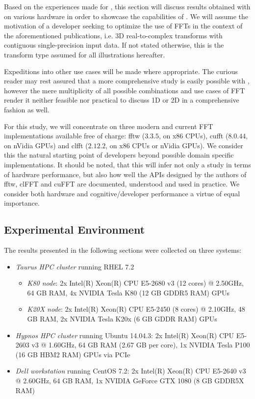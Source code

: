 Based on the experiences made for \cite{preibisch2014efficient, schmid2015real}, this section will discuss results obtained with \gearshifft{} on various hardware in order to showcase the capabilities of \gearshifft{}. We will assume the motivation of a developer seeking to optimize the use of FFTs in the context of the aforementioned publications, i.e. 3D real-to-complex transforms with contiguous single-precision input data. If not stated otherwise, this is the transform type assumed for all illustrations hereafter. 

Expeditions into other use cases will be made where appropriate. The curious reader may rest assured that a more comprehensive study is easily possible with \gearshifft{}, however the mere multiplicity of all possible combinations and use cases of FFT render it neither feasible nor practical to discuss 1D or 2D in a comprehensive fashion as well.

For this study, we will concentrate on three modern and current FFT implementations available free of charge: fftw ($3.3.5$, on x86 CPUs), cufft ($8.0.44$, on nVidia GPUs) and clfft ($2.12.2$, on x86 CPUs or nVidia GPUs). We consider this the natural starting point of developers beyond possible domain specific implementations. It should be noted, that this will infer not only a study in terms of hardware performance, but also how well the APIs designed by the authors of fftw, clFFT and cuFFT are documented, understood and used in practice. We consider both hardware and cognitive/developer performance a virtue of equal importance.

\subsection{Experimental Environment}
\label{ssec:env}

The results presented in the following sections were collected on three systems:

\begin{itemize}
\item \emph{Taurus HPC cluster}\cite{taurus} running RHEL 7.2
  \begin{itemize}
  \item \emph{K80 node}: 2x Intel(R) Xeon(R) CPU E5-2680 v3 (12 cores) @ 2.50GHz, 64 GB RAM, 4x NVIDIA Tesla K80 (12 GB GDDR5 RAM) GPUs 
  \item \emph{K20X node}: 2x Intel(R) Xeon(R) CPU E5-2450 (8 cores) @ 2.10GHz, 48 GB RAM, 2x NVIDIA Tesla K20x (6 GB GDDR RAM) GPUs 
  \end{itemize}
\item \emph{Hypnos HPC cluster}\cite{hypnos} running Ubuntu 14.04.3:\newline
  2x Intel(R) Xeon(R) CPU E5-2603 v3 @ 1.60GHz, 64 GB RAM (2.67 GB per core), 1x NVIDIA Tesla P100 (16 GB HBM2 RAM) GPUs via PCIe 
\item  \emph{Dell workstation} running CentOS 7.2:\newline 
  2x Intel(R) Xeon(R) CPU E5-2640 v3 @ 2.60GHz, 64 GB RAM, 1x NVIDIA GeForce GTX 1080 (8 GB GDDR5X RAM)
\end{itemize}

